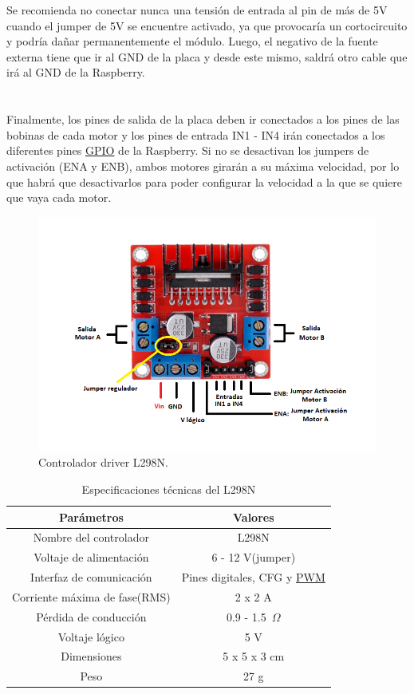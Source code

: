 Se recomienda no conectar nunca una tensión de entrada al pin de más de 5V cuando el jumper de 5V se encuentre activado, ya que provocaría un cortocircuito y podría dañar permanentemente el módulo. Luego, el negativo de la fuente externa tiene que ir al GND de la placa y desde este mismo, saldrá otro cable que irá al GND de la Raspberry.\\ \\ \\

Finalmente, los pines de salida de la placa deben ir conectados a los pines de las bobinas de cada motor y los pines de entrada IN1 - IN4 irán conectados a los diferentes pines \hyperlink{GPIO}{GPIO} de la Raspberry. Si no se desactivan los jumpers de activación (ENA y ENB), ambos motores girarán a su máxima velocidad, por lo que habrá que desactivarlos para poder configurar la velocidad a la que se quiere que vaya cada motor.

\begin{figure}[H]
  \centering
  \includegraphics[scale=0.6]{figs/L298N} %
  \caption{Controlador driver L298N.}
  \label{fig:l298n}
\end{figure}

\begin{table}[H]
\begin{center}
\begin{tabular}{|c|c|}
\hline
\textbf{Parámetros} & \textbf{Valores} \\
\hline
Nombre del controlador & L298N \\
Voltaje de alimentación & 6 - 12 V(jumper) \\
Interfaz de comunicación & Pines digitales, CFG y \hyperlink{PWM}{PWM} \\
Corriente máxima de fase(RMS) & 2 x 2 A \\
Pérdida de conducción & 0.9 - 1.5~$\Omega$ \\
Voltaje lógico & 5 V \\
Dimensiones & 5 x 5 x 3 cm \\
Peso & 27 g \\
\hline
\end{tabular}
\caption{Especificaciones técnicas del L298N}
\label{cuadro:ejemplo}
\end{center}
\end{table}

